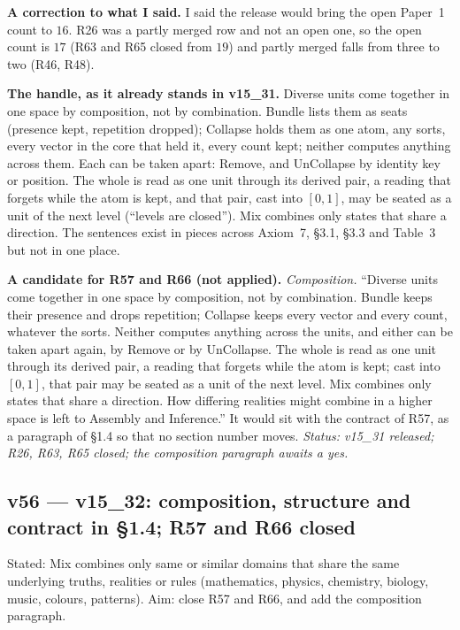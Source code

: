 \documentclass[11pt]{article}
\begin{document}
\textbf{A correction to what I said.} I said the release would bring the open Paper~1 count to $16$. R26 was a partly merged row and not an open one, so the open count is $17$ (R63 and R65 closed from $19$) and partly merged falls from three to two (R46, R48).

\textbf{The handle, as it already stands in v15\_31.} Diverse units come together in one space by composition, not by combination. Bundle lists them as seats (presence kept, repetition dropped); Collapse holds them as one atom, any sorts, every vector in the core that held it, every count kept; neither computes anything across them. Each can be taken apart: Remove, and UnCollapse by identity key or position.
The whole is read as one unit through its derived pair, a reading that forgets while the atom is kept, and that pair, cast into $[0,1]$, may be seated as a unit of the next level (``levels are closed''). Mix combines only states that share a direction. The sentences exist in pieces across Axiom~7, \S3.1, \S3.3 and Table~3 but not in one place.

\textbf{A candidate for R57 and R66 (not applied).} \emph{Composition.} ``Diverse units come together in one space by composition, not by combination. Bundle keeps their presence and drops repetition; Collapse keeps every vector and every count, whatever the sorts. Neither computes anything across the units, and either can be taken apart again, by Remove or by UnCollapse. The whole is read as one unit through its derived pair,
a reading that forgets while the atom is kept; cast into $[0,1]$, that pair may be seated as a unit of the next level. Mix combines only states that share a direction. How differing realities might combine in a higher space is left to Assembly and Inference.'' It would sit with the contract of R57, as a paragraph of \S1.4 so that no section number moves.
\emph{Status: v15\_31 released; R26, R63, R65 closed; the composition paragraph awaits a yes.}


\subsection*{v56 --- v15\_32: composition, structure and contract in \S1.4; R57 and R66 closed}
Stated: Mix combines only same or similar domains that share the same underlying truths, realities or rules (mathematics, physics, chemistry, biology, music, colours, patterns). Aim: close R57 and R66, and add the composition paragraph.
\end{document}
